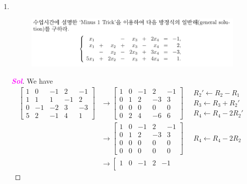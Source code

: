 \documentclass[10pt]{article}
\theoremstyle{definition}
\newcommand{\R}{\mathbb{R}}
\newcommand{\sol}{\textcolor{magenta}{\bf Sol}}
\begin{document}

\begin{enumerate}[\bf 1.]
\item \ \begin{figure}[h!]
	\includegraphics[scale=.35]{asgmt1_1.png}
\end{figure}
\begin{proof}[\sol]
	We have\begin{align*}
		\left[
		\begin{array}{cccc|c}
			1 & 0 & -1 & 2 & -1\\
			1 & 1 & 1 & -1 & 2\\
			0 & -1 & -2 & 3 & -3\\
			5 & 2 & -1 & 4 & 1
		\end{array}
		\right]&\rightarrow
		\left[
		\begin{array}{cccc|c}
			1 & 0 & -1 & 2 & -1\\
			0 & 1 & 2 & -3 & 3\\
			0 & 0 & 0 & 0 & 0\\
			0 & 2 & 4 & -6 & 6
		\end{array}
		\right]\quad\substack{R_2'\gets R_2-R_1\\R_3\gets R_3+R_2'\\R_4\gets R_4-2R_2'}\\
		&\rightarrow
		\left[
		\begin{array}{cccc|c}
			1 & 0 & -1 & 2 & -1\\
			0 & 1 & 2 & -3 & 3\\
			0 & 0 & 0 & 0 & 0\\
			0 & 0 & 0 & 0 & 0
		\end{array}
		\right]\quad\substack{R_4\gets R_4-2R_2}\\
		&\rightarrow
		\left[
		\begin{array}{cccc|c}
			1 & 0 & -1 & 2 & -1\\

\end{array}
\end{align*}
\end{proof}
\end{enumerate}
\end{document}
